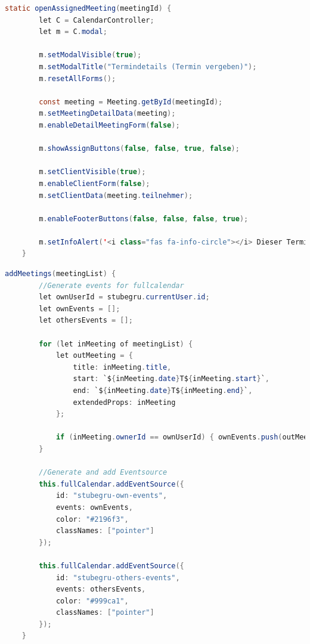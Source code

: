 \documentclass[12pt]{article}
\begin{document}
\begin{lstlisting}[language=Java]
    static openAssignedMeeting(meetingId) {
        let C = CalendarController;
        let m = C.modal;

        m.setModalVisible(true);
        m.setModalTitle("Termindetails (Termin vergeben)");
        m.resetAllForms();

        const meeting = Meeting.getById(meetingId);
        m.setMeetingDetailData(meeting);
        m.enableDetailMeetingForm(false);

        m.showAssignButtons(false, false, true, false);

        m.setClientVisible(true);
        m.enableClientForm(false);
        m.setClientData(meeting.teilnehmer);

        m.enableFooterButtons(false, false, false, true);

        m.setInfoAlert('<i class="fas fa-info-circle"></i> Dieser Termin ist bereits an einen Kunden vergeben. Bearbeiten des Termins ist nur moeglich, nachdem die Kundendaten geloescht wurden.');
    }
\end{lstlisting}

\begin{lstlisting}[language=Java]
    addMeetings(meetingList) {
        //Generate events for fullcalendar
        let ownUserId = stubegru.currentUser.id;
        let ownEvents = [];
        let othersEvents = [];

        for (let inMeeting of meetingList) {
            let outMeeting = {
                title: inMeeting.title,
                start: `${inMeeting.date}T${inMeeting.start}`,
                end: `${inMeeting.date}T${inMeeting.end}`,
                extendedProps: inMeeting
            };

            if (inMeeting.ownerId == ownUserId) { ownEvents.push(outMeeting); } else { othersEvents.push(outMeeting); }
        }

        //Generate and add Eventsource
        this.fullCalendar.addEventSource({
            id: "stubegru-own-events",
            events: ownEvents,
            color: "#2196f3",
            classNames: ["pointer"]
        });

        this.fullCalendar.addEventSource({
            id: "stubegru-others-events",
            events: othersEvents,
            color: "#999ca1",
            classNames: ["pointer"]
        });
    }
\end{lstlisting}
\end{document}
